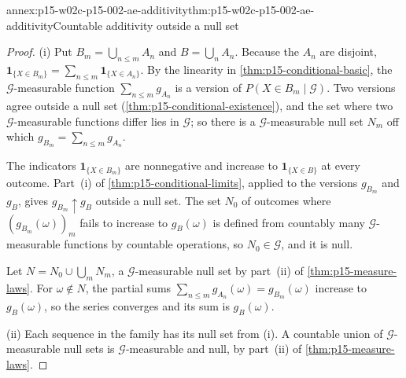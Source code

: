 \begin{annexitem}{annex:p15-w02c-p15-002-ae-additivity}{thm:p15-w02c-p15-002-ae-additivity}{Countable additivity outside a null set}
\begin{proof}
(i) Put \(B_m=\bigcup_{n\leq m}A_n\) and \(B=\bigcup_nA_n\). Because the
\(A_n\) are disjoint,
\(\mathbf1_{\{X\in B_m\}}=\sum_{n\leq m}\mathbf1_{\{X\in A_n\}}\). By the
linearity in \cref{thm:p15-conditional-basic}, the
\(\mathcal G\)-measurable function \(\sum_{n\leq m}g_{A_n}\) is a version
of \(P(X\in B_m\mid\mathcal G)\). Two versions agree outside a null set
(\cref{thm:p15-conditional-existence}), and the set where two
\(\mathcal G\)-measurable functions differ lies in \(\mathcal G\); so there
is a \(\mathcal G\)-measurable null set \(N_m\) off which
\(g_{B_m}=\sum_{n\leq m}g_{A_n}\).

The indicators \(\mathbf1_{\{X\in B_m\}}\) are nonnegative and increase to
\(\mathbf1_{\{X\in B\}}\) at every outcome. Part~(i) of
\cref{thm:p15-conditional-limits}, applied to the versions \(g_{B_m}\) and
\(g_B\), gives \(g_{B_m}\uparrow g_B\) outside a null set. The set \(N_0\)
of outcomes where \((g_{B_m}(\omega))_m\) fails to increase to
\(g_B(\omega)\) is defined from countably many \(\mathcal G\)-measurable
functions by countable operations, so \(N_0\in\mathcal G\), and it is null.

Let \(N=N_0\cup\bigcup_mN_m\), a \(\mathcal G\)-measurable null set by
part~(ii) of \cref{thm:p15-measure-laws}. For \(\omega\notin N\), the
partial sums \(\sum_{n\leq m}g_{A_n}(\omega)=g_{B_m}(\omega)\) increase to
\(g_B(\omega)\), so the series converges and its sum is
\(g_B(\omega)\).

(ii) Each sequence in the family has its null set from (i). A countable
union of \(\mathcal G\)-measurable null sets is \(\mathcal G\)-measurable
and null, by part~(ii) of \cref{thm:p15-measure-laws}.
\end{proof}
\end{annexitem}

